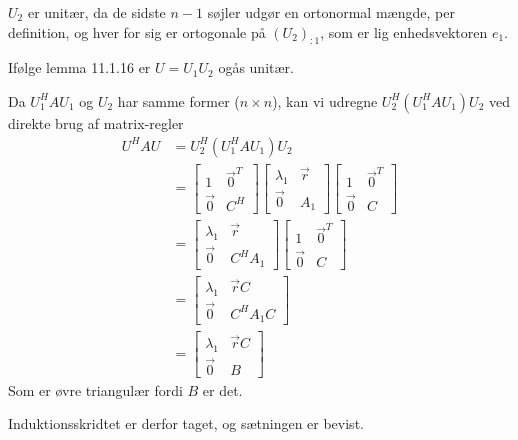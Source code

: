 \begin{bevis}
	$U_2$ er unitær, da de sidste $n-1$ søjler udgør en ortonormal mængde, per
	definition, og hver for sig er ortogonale på $(U_2)_{:1}$, som er lig 
	enhedsvektoren $e_1$.

	Ifølge lemma 11.1.16 er $U=U_1U_2$ ogås unitær.

	Da $U_1^HAU_1$ og $U_2$ har samme former ($n \times n$), kan vi udregne
	$U_2^H(U_1^HAU_1)U_2$ ved direkte brug af matrix-regler
	\begin{align*}
		U^HAU &= U_2^H(U_1^HAU_1)U_2\\
		&= \begin{bmatrix}
			1 & \vec{0}^T\\
			\vec{0} & C^H
		\end{bmatrix}
		\begin{bmatrix}
			\lambda_1 & \vec{r}\\
			\vec{0}   & A_1
		\end{bmatrix}
		\begin{bmatrix}
			1 & \vec{0}^T\\
			\vec{0} & C
		\end{bmatrix}\\
		&= \begin{bmatrix}
			\lambda_1 & \vec{r}\\
			\vec{0}   & C^HA_1
		\end{bmatrix}
		\begin{bmatrix}
			1 & \vec{0}^T\\
			\vec{0} & C
		\end{bmatrix}\\
		&= \begin{bmatrix}
			\lambda_1 & \vec{r}C\\
			\vec{0}   & C^HA_1C
		\end{bmatrix}\\
		&= \begin{bmatrix}
			\lambda_1 & \vec{r}C\\
			\vec{0}   & B
		\end{bmatrix}
	\end{align*}
	Som er øvre triangulær fordi $B$ er det.

	Induktionsskridtet er derfor taget, og sætningen er bevist.
\end{bevis}
